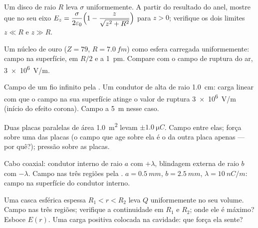 \begin{exercise}[$\star\star$]\label{exo:b1:electrostatics-gauss:5}
Um disco de raio $R$ leva $\sigma$ uniformemente. A partir do resultado do anel,
mostre que no seu eixo $E_z = \dfrac{\sigma}{2\varepsilon_0}\Bigl(1 - \dfrac{z}{\sqrt{z^2 +
R^2}}\Bigr)$ para $z > 0$; verifique os dois limites $z \ll R$ e $z \gg R$.
\end{exercise}

\begin{exercise}[$\star\star$]\label{exo:b1:electrostatics-gauss:6}
Um núcleo de ouro ($Z = 79$, $R = \qty{7.0}{fm}$) como esfera carregada
uniformemente: campo na superfície, em $R/2$ e a \qty{1}{pm}. Compare com o
campo de ruptura do ar, \qty{3e6}{V/m}.
\end{exercise}

\begin{exercise}[$\star\star$]\label{exo:b1:electrostatics-gauss:7}
Campo de um fio infinito pela . Um condutor de alta  de
raio \qty{1.0}{cm}: carga linear com que o campo na sua superfície
atinge o valor de ruptura \qty{3e6}{V/m} (início do efeito corona). Campo a
\qty{5}{m} nesse caso.
\end{exercise}

\begin{exercise}[$\star\star$]\label{exo:b1:electrostatics-gauss:8}
Duas placas paralelas de área \qty{1.0}{m^2} levam $\pm\qty{1.0}{\micro C}$.
Campo entre elas; força sobre uma das placas (o campo que age sobre ela é o
da outra placa apenas --- por quê?); pressão sobre as placas.
\end{exercise}

\begin{exercise}[$\star\star$]\label{exo:b1:electrostatics-gauss:9}
Cabo coaxial: condutor interno de raio $a$ com $+\lambda$, blindagem
externa de raio $b$ com $-\lambda$. Campo nas três regiões pela . $a = \qty{0.5}{mm}$, $b = \qty{2.5}{mm}$, $\lambda = \qty{10}{nC/m}$:
campo na superfície do condutor interno.
\end{exercise}

\begin{exercise}[$\star\star\star$]\label{exo:b1:electrostatics-gauss:10}
Uma casca esférica espessa $R_1 < r < R_2$ leva $Q$ uniformemente no seu
volume. Campo nas três regiões; verifique a continuidade em $R_1$ e
$R_2$; onde ele é máximo? Esboce $E(r)$. Uma carga positiva colocada
na cavidade: que força ela sente?
\end{exercise}

